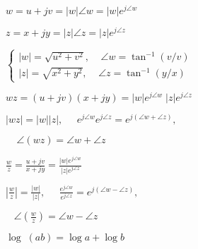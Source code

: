 \documentclass{article}
\def\lthtmlcheckvsize{\ifdim\ht\sizebox<\vsize 
  \ifdim\wd\sizebox<\hsize\expandafter\hfill\fi \expandafter\vfill
  \else\expandafter\vss\fi}%
\begin{document}
{\newpage\clearpage
{}%
$ w=u+jv=|w|\angle w=|w|e^{j\angle w}$%
\lthtmlindisplaymathZ
\lthtmlcheckvsize\clearpage}

{\newpage\clearpage
{}%
$ z=x+jy=|z|\angle z=|z|e^{j\angle z}$%
\lthtmlindisplaymathZ
\lthtmlcheckvsize\clearpage}

{\newpage\clearpage
{}%
$\displaystyle \left\{ \begin{array}{l}
|w|=\sqrt{u^2+v^2},\;\;\;\;\angle w=\tan^{-1}\left( v/v \right) \\
|z|=\sqrt{x^2+y^2},\;\;\;\;\angle z=\tan^{-1}\left( y/x \right) \end{array} \right.$%
\lthtmlindisplaymathZ
\lthtmlcheckvsize\clearpage}

{\newpage\clearpage
{}%
$\displaystyle w z=(u+jv)(x+jy)=|w|e^{j\angle w}\;|z|e^{j\angle z}$%
\lthtmlindisplaymathZ
\lthtmlcheckvsize\clearpage}

{\newpage\clearpage
{}%
$\displaystyle \left| wz \right| =|w||z|,\;\;\;\;\;
e^{j\angle w} e^{j\angle z}=e^{j(\angle w+\angle z)},
\;\;\;$%
\lthtmlindisplaymathZ
\lthtmlcheckvsize\clearpage}

{\newpage\clearpage
{}%
$\displaystyle \;\;\;\;
\angle \left( wz \right) =\angle w+\angle z$%
\lthtmlindisplaymathZ
\lthtmlcheckvsize\clearpage}

{\newpage\clearpage
{}%
$\displaystyle \frac{w}{z}=\frac{u+jv}{x+jy}=\frac{|w|e^{j\angle w}}{|z|e^{j\angle z}}$%
\lthtmlindisplaymathZ
\lthtmlcheckvsize\clearpage}

{\newpage\clearpage
{}%
$\displaystyle \left| \frac{w}{z} \right| =\frac{|w|}{|z|},\;\;\;\;\;
\frac{e^{j\angle w}}{e^{j\angle z}}=e^{j(\angle w-\angle z)},\;\;\;$%
\lthtmlindisplaymathZ
\lthtmlcheckvsize\clearpage}

{\newpage\clearpage
{}%
$\displaystyle \;\;\;
\angle \left( \frac{w}{z} \right)=\angle w-\angle z$%
\lthtmlindisplaymathZ
\lthtmlcheckvsize\clearpage}

{\newpage\clearpage
{}%
$\displaystyle \log \;(ab)=\log a+\log b$%
\lthtmlindisplaymathZ
\lthtmlcheckvsize\clearpage}
\end{document}
